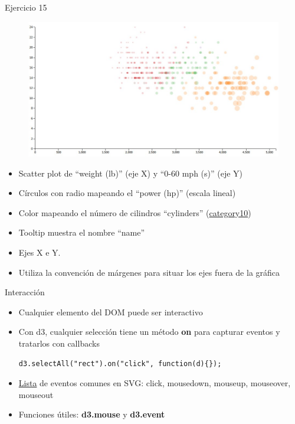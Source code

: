 \documentclass[ignorenonframetext,]{beamer}
\makeatletter
\def\ScaleIfNeededW{%
  \ifdim\Gin@nat@width>\linewidth
    \linewidth
  \else
    \Gin@nat@width
  \fi
}
\def\ScaleIfNeededH{%
  \ifdim\Gin@nat@height>0.6\textheight
    0.6\textheight
  \else
    \Gin@nat@height
  \fi
}
\let\Oldincludegraphics\includegraphics
\renewcommand{\includegraphics}[2][]{\Oldincludegraphics[width=\ScaleIfNeededW, height=\ScaleIfNeededH,keepaspectratio]{#2}}
\makeatother
\begin{document}
\begin{frame}{Ejercicio 15}

\begin{figure}[htbp]
\centering
\includegraphics{../rsc/images/ej15.jpg}
\end{figure}

\end{frame}

\begin{frame}

\begin{itemize}
\item
  Scatter plot de ``weight (lb)'' (eje X) y ``0-60 mph (s)'' (eje Y)
\item
  Círculos con radio mapeando el ``power (hp)'' (escala lineal)
\item
  Color mapeando el número de cilindros ``cylinders''
  (\href{https://github.com/mbostock/d3/wiki/Ordinal-Scales\#category10}{category10})
\item
  Tooltip muestra el nombre ``name''
\item
  Ejes X e Y.
\item
  Utiliza la convención de márgenes para situar los ejes fuera de la
  gráfica
\end{itemize}

\end{frame}

\begin{frame}[fragile]{Interacción}

\begin{itemize}
\item
  Cualquier elemento del DOM puede ser interactivo
\item
  Con d3, cualquier selección tiene un método \textbf{on} para capturar
  eventos y tratarlos con callbacks

\begin{lstlisting}
d3.selectAll("rect").on("click", function(d){});
\end{lstlisting}
\item
  \href{http://www.w3.org/TR/SVG11/interact.html}{Lista} de eventos
  comunes en SVG: click, mousedown, mouseup, mouseover, mouseout
\item
  Funciones útiles: \textbf{d3.mouse} y \textbf{d3.event}
\end{itemize}

\end{frame}
\end{document}
